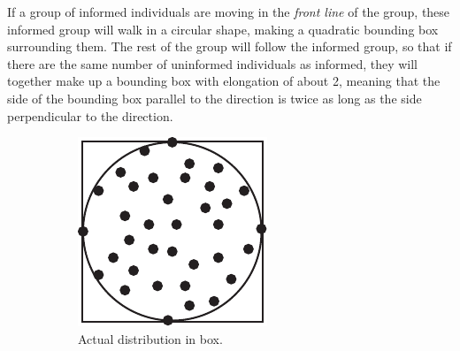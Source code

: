 If a group of informed individuals are moving in the \emph{front line} of the group, these informed group will walk in a circular shape, making a quadratic bounding box surrounding them. 
The rest of the group will follow the informed group, so that if there are the same number of uninformed individuals as informed, they will together make up a bounding box with elongation of about 2, meaning that the side of the bounding box parallel to the direction is twice as long as the side perpendicular to the direction.
\newcommand{\figwidth}{0.21\textwidth}
\begin{figure}[H]
	\centering
	\begin{subfigure}[b]{\figwidth}
		\includegraphics[width=\textwidth]{img/Circle.pdf}
		\caption{Actual distribution in box.}
		\label{fig:distr_true}
	\end{subfigure}
	~
	\begin{subfigure}[b]{\figwidth}

\end{subfigure}
\end{figure}
